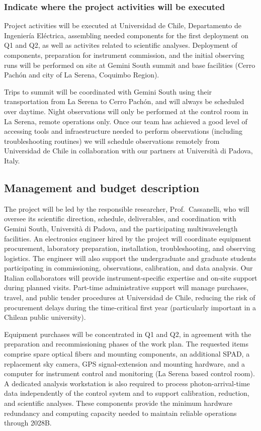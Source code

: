 \documentclass[
    11pt,
    a4paper,
    ]{article}
\begin{document}
\subsubsection{Indicate where the project activities will be executed}

Project activities will be executed at Universidad de Chile, Departamento de Ingeniería Eléctrica, assembling needed components for the first deployment on Q1 and Q2, as well as activites related to scientific analyses. Deployment of components, preparation for instrument commission, and the initial observing runs will be performed on site at Gemini South summit and base facilities (Cerro Pachón and city of La Serena, Coquimbo Region).

Trips to summit will be coordinated with Gemini South using their transportation from La Serena to Cerro Pachón, and will always be scheduled over daytime. Night observations will only be performed at the control room in La Serena, remote operations only. Once our team has achieved a good level of accessing tools and infraestructure needed to perform observations (including troubleshooting routines) we will schedule observations remotely from Universidad de Chile in collaboration with our partners at Università di Padova, Italy.

\setcounter{subsection}{3}
\subsection{Management and budget description}

The project will be led by the responsible researcher, Prof.\ Cassanelli, who will oversee its scientific direction, schedule, deliverables, and coordination with Gemini South, Università di Padova, and the participating multiwavelength facilities. An electronics engineer hired by the project will coordinate equipment procurement, laboratory preparation, installation, troubleshooting, and observing logistics. The engineer will also support the undergraduate and graduate students participating in commissioning, observations, calibration, and data analysis. Our Italian collaborators will provide instrument-specific expertise and on-site support during planned visits. Part-time administrative support will manage purchases, travel, and public tender procedures at Universidad de Chile, reducing the risk of procurement delays during the time-critical first year (particularly important in a Chilean public university).

Equipment purchases will be concentrated in Q1 and Q2, in agreement with the preparation and recommissioning phases of the work plan. The requested items comprise spare optical fibers and mounting components, an additional SPAD, a replacement sky camera, GPS signal-extension and mounting hardware, and a computer for instrument control and monitoring (La Serena based control room). A dedicated analysis workstation is also required to process photon-arrival-time data independently of the control system and to support calibration, reduction, and scientific analyses. These components provide the minimum hardware redundancy and computing capacity needed to maintain reliable operations through 2028B.
\end{document}
